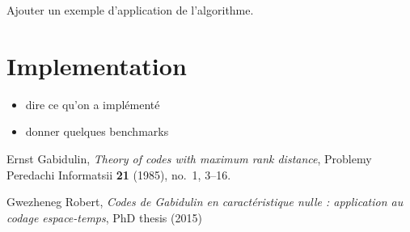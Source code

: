 \documentclass[a4paper]{llncs}
\def\todo#1{{\color{todo} #1}}
\begin{document}
\todo{Ajouter un exemple d'application de l'algorithme.}

\section{Implementation}

\todo{\begin{itemize}
\item dire ce qu'on a implémenté
\item donner quelques benchmarks
\end{itemize}}

\begin{thebibliography}{99}
  Ernst Gabidulin,
  \emph{Theory of codes with maximum rank distance},
  Problemy Peredachi Informatsii \textbf{21} (1985), no.~1, 3--16.

  Gwezheneg Robert,
  \emph{Codes de Gabidulin en caractéristique nulle : application au codage espace-temps},
  PhD thesis (2015)

\end{thebibliography}
\end{document}
